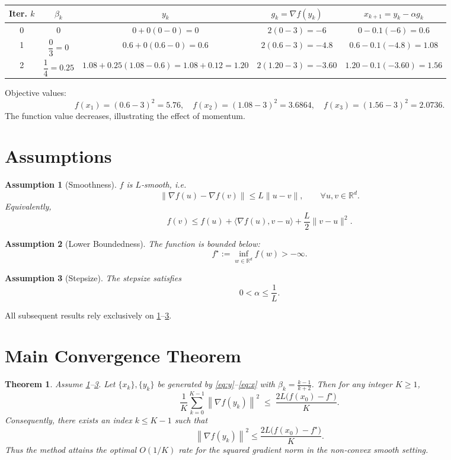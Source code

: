 \documentclass{article}
\newtheorem{theorem}{Theorem}
\newtheorem{assumption}{Assumption}
\newcommand{\norm}[1]{\left\lVert #1\right\rVert}
\begin{document}
\begin{tabular}{c|c|c|c|c}
\textbf{Iter.} $k$ & $\beta_k$ & $y_k$ & $g_k=\nabla f(y_k)$ & $x_{k+1}=y_k-\alpha g_k$ \\ \hline
0 & $0$ & $0+0(0-0)=0$ & $2(0-3)=-6$ & $0-0.1(-6)=0.6$ \\
1 & $\dfrac{0}{3}=0$ & $0.6+0(0.6-0)=0.6$ & $2(0.6-3)=-4.8$ & $0.6-0.1(-4.8)=1.08$ \\
2 & $\dfrac{1}{4}=0.25$ & $1.08+0.25(1.08-0.6)=1.08+0.12=1.20$ & $2(1.20-3)=-3.60$ & $1.20-0.1(-3.60)=1.56$
\end{tabular}

Objective values:
\[
f(x_1)= (0.6-3)^2=5.76,\quad
f(x_2)= (1.08-3)^2=3.6864,\quad
f(x_3)= (1.56-3)^2=2.0736.
\]
The function value decreases, illustrating the effect of momentum.

\newpage

\section*{Assumptions}
\begin{assumption}[Smoothness]\label{as:smooth}
$f$ is $L$‑smooth, i.e.
\[
\|\nabla f(u)-\nabla f(v)\|\le L\|u-v\|,\qquad\forall u,v\in\mathbb{R}^d .
\]
Equivalently,
\[
f(v)\le f(u)+\langle\nabla f(u),v-u\rangle+\frac{L}{2}\|v-u\|^2 .
\tag{A1}
\]
\end{assumption}
\begin{assumption}[Lower Boundedness]\label{as:bound}
The function is bounded below:
\[
f^\star:=\inf_{w\in\mathbb{R}^d}f(w)>-\infty .
\tag{A2}
\]
\end{assumption}
\begin{assumption}[Stepsize]\label{as:step}
The stepsize satisfies
\[
0<\alpha\le\frac{1}{L}.
\tag{A3}
\]
\end{assumption}

All subsequent results rely exclusively on \ref{as:smooth}–\ref{as:step}.

\section*{Main Convergence Theorem}
\begin{theorem}\label{thm:main}
Assume \ref{as:smooth}–\ref{as:step}. Let $\{x_k\},\{y_k\}$ be generated by \eqref{eq:y}–\eqref{eq:x} with $\beta_k=\frac{k-1}{k+2}$. Then for any integer $K\ge1$,
\[
\frac{1}{K}\sum_{k=0}^{K-1}\norm{\nabla f(y_k)}^{2}
\;\le\;
\frac{2L\bigl(f(x_0)-f^\star\bigr)}{K}.
\tag{T1}
\]
Consequently, there exists an index $k\le K-1$ such that
\[
\norm{\nabla f(y_k)}^{2}\le\frac{2L\bigl(f(x_0)-f^\star\bigr)}{K}.
\tag{T2}
\]
Thus the method attains the optimal $O(1/K)$ rate for the squared gradient norm in the non‑convex smooth setting.
\end{theorem}
\end{document}

